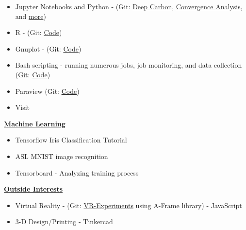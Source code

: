 \documentclass[11pt]{ltxdoc}
\begin{document}
\begin{description}
\begin{itemize}
        \item Jupyter Notebooks and Python - (Git: \href{https://github.com/hlokavarapu/Prospectus/blob/master/SlideDeck/MeetingPresentation.ipynb}{Deep Carbon}, \href{https://github.com/EGP-CIG-REU/SECOND_PARTICLE_PAPER/blob/master/00JUPYTER_NOTEBOOKS/egp_time_dependent_annulus_v-02/egp_time_dependent_annulus_v-02-Exact.ipynb}{Convergence Analysis}, and \href{https://github.com/hlokavarapu/Geology_Journal/tree/master/00JUPYTER}{more})
        
        \item R - (Git: \href{https://github.com/hlokavarapu/computational_tools/tree/master/R_scripts}{Code})
        
      	\item Gnuplot - (Git: \href{https://github.com/hlokavarapu/computational_tools/tree/master/Gnuplot_scripts}{Code})
        
        \item Bash scripting - running numerous jobs, job monitoring, and data collection (Git: \href{https://github.com/hlokavarapu/computational_tools/tree/master/slurm_scripts}{Code})
      	
        \item Paraview (Git: \href{https://github.com/hlokavarapu/computational_tools/blob/master/Paraview_scripts/Find_timestep_given_nondim_time_2_comp.py}{Code})
       
        \item Visit
                
      \end{itemize}
    
    \item[] \textbf{\underline{Machine Learning}}
    
      \begin{itemize}
        \item Tensorflow Iris Classification Tutorial
        \item ASL MNIST image recognition
        \item Tensorboard - Analyzing training process
      \end{itemize}
      
    \item[] \textbf{\underline{Outside Interests}}
    
      \begin{itemize}
        \item Virtual Reality - (Git: \href{https://github.com/hlokavarapu/VR-Experiments}{VR-Experiments} using A-Frame library) - JavaScript
        \item  3-D Design/Printing - Tinkercad
      \end{itemize}

  \end{description}

\newpage

\vskip 12pt
\end{document}

